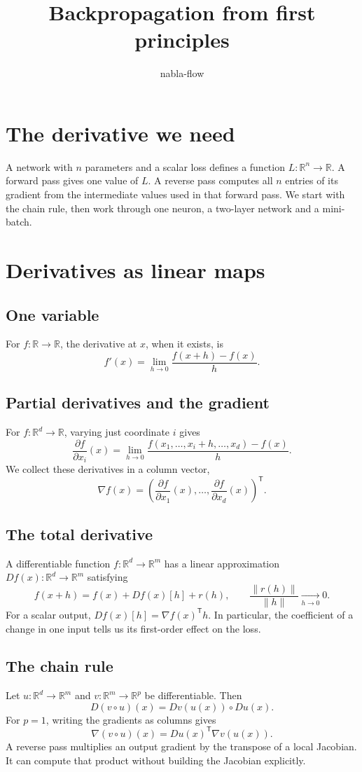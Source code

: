 \documentclass[11pt,a4paper]{article}
\title{Backpropagation from first principles}
\author{nabla-flow}
\date{}
\newcommand{\R}{\mathbb{R}}
\newcommand{\T}{\mathsf{T}}
\begin{document}
\maketitle

\section{The derivative we need}
A network with $n$ parameters and a scalar loss defines a function $L:\R^n\to\R$.
A forward pass gives one value of $L$. A reverse pass computes all $n$ entries
of its gradient from the intermediate values used in that forward pass.
We start with the chain rule, then work through one neuron, a two-layer
network and a mini-batch.

\section{Derivatives as linear maps}
\subsection{One variable}
For $f:\R\to\R$, the derivative at $x$, when it exists, is
\[
f'(x)=\lim_{h\to 0}\frac{f(x+h)-f(x)}{h}.
\]

\subsection{Partial derivatives and the gradient}
For $f:\R^d\to\R$, varying just coordinate $i$ gives
\[
\frac{\partial f}{\partial x_i}(x)=
\lim_{h\to 0}\frac{f(x_1,\ldots,x_i+h,\ldots,x_d)-f(x)}{h}.
\]
We collect these derivatives in a column vector,
\[
\nabla f(x)=
\left(\frac{\partial f}{\partial x_1}(x),\ldots,
      \frac{\partial f}{\partial x_d}(x)\right)^\T.
\]

\subsection{The total derivative}
A differentiable function $f:\R^d\to\R^m$ has a linear approximation
$Df(x):\R^d\to\R^m$ satisfying
\[
f(x+h)=f(x)+Df(x)[h]+r(h),\qquad
\frac{\|r(h)\|}{\|h\|}\xrightarrow[h\to 0]{}0.
\]
For a scalar output, $Df(x)[h]=\nabla f(x)^\T h$. In particular, the
coefficient of a change in one input tells us its first-order effect
on the loss.

\subsection{The chain rule}
Let $u:\R^d\to\R^m$ and $v:\R^m\to\R^p$ be differentiable. Then
\[
D(v\circ u)(x)=Dv(u(x))\circ Du(x).
\]
For $p=1$, writing the gradients as columns gives
\[
\nabla (v\circ u)(x)=Du(x)^\T\nabla v(u(x)).
\]
A reverse pass multiplies an output gradient by the transpose of a local
Jacobian. It can compute that product without building the Jacobian explicitly.
\end{document}
